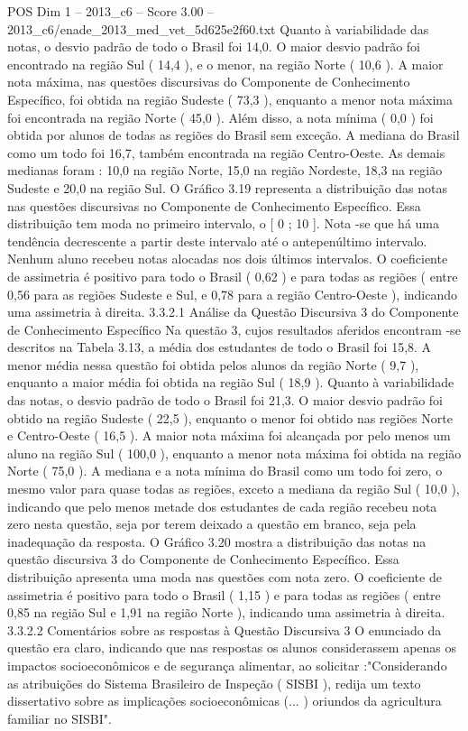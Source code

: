\begin{textsample}{POS Dim 1 – 2013\_c6 – Score 3.00 – 2013\_c6/enade\_2013\_med\_vet\_5d625e2f60.txt}
Quanto à variabilidade das notas, o desvio padrão de todo o Brasil foi 14,0.
O maior desvio padrão foi encontrado na região Sul ( 14,4 ), e o menor, na região Norte ( 10,6 ).
A maior nota máxima, nas questões discursivas do Componente de Conhecimento Específico, foi obtida na região Sudeste ( 73,3 ), enquanto a menor nota máxima foi encontrada na região Norte ( 45,0 ).
Além disso, a nota mínima ( 0,0 ) foi obtida por alunos de todas as regiões do Brasil sem exceção.
A mediana do Brasil como um todo foi 16,7, também encontrada na região Centro-Oeste.
As demais medianas foram : 10,0 na região Norte, 15,0 na região Nordeste, 18,3 na região Sudeste e 20,0 na região Sul.
O Gráfico 3.19 representa a distribuição das notas nas questões discursivas no Componente de Conhecimento Específico.
Essa distribuição tem moda no primeiro intervalo, o [ 0 ; 10 ].
Nota -se que há uma tendência decrescente a partir deste intervalo até o antepenúltimo intervalo.
Nenhum aluno recebeu notas alocadas nos dois últimos intervalos.
O coeficiente de assimetria é positivo para todo o Brasil ( 0,62 ) e para todas as regiões ( entre 0,56 para as regiões Sudeste e Sul, e 0,78 para a região Centro-Oeste ), indicando uma assimetria à direita. 3.3.2.1 Análise da Questão Discursiva 3 do Componente de Conhecimento Específico Na questão 3, cujos resultados aferidos encontram -se descritos na Tabela 3.13, a média dos estudantes de todo o Brasil foi 15,8.
A menor média nessa questão foi obtida pelos alunos da região Norte ( 9,7 ), enquanto a maior média foi obtida na região Sul ( 18,9 ).
Quanto à variabilidade das notas, o desvio padrão de todo o Brasil foi 21,3.
O maior desvio padrão foi obtido na região Sudeste ( 22,5 ), enquanto o menor foi obtido nas regiões Norte e Centro-Oeste ( 16,5 ).
A maior nota máxima foi alcançada por pelo menos um aluno na região Sul ( 100,0 ), enquanto a menor nota máxima foi obtida na região Norte ( 75,0 ).
A mediana e a nota mínima do Brasil como um todo foi zero, o mesmo valor para quase todas as regiões, exceto a mediana da região Sul ( 10,0 ), indicando que pelo menos metade dos estudantes de cada região recebeu nota zero nesta questão, seja por terem deixado a questão em branco, seja pela inadequação da resposta.
O Gráfico 3.20 mostra a distribuição das notas na questão discursiva 3 do Componente de Conhecimento Específico.
Essa distribuição apresenta uma moda nas questões com nota zero.
O coeficiente de assimetria é positivo para todo o Brasil ( 1,15 ) e para todas as regiões ( entre 0,85 na região Sul e 1,91 na região Norte ), indicando uma assimetria à direita. 3.3.2.2 Comentários sobre as respostas à Questão Discursiva 3 O enunciado da questão era claro, indicando que nas respostas os alunos considerassem apenas os impactos socioeconômicos e de segurança alimentar, ao solicitar :"Considerando as atribuições do Sistema Brasileiro de Inspeção ( SISBI ), redija um texto dissertativo sobre as implicações socioeconômicas (... ) oriundos da agricultura familiar no SISBI".

\end{textsample}
